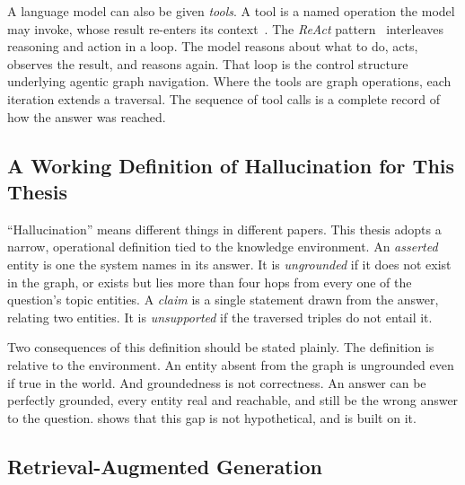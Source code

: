 A language model can also be given \emph{tools}. A tool is a named operation the
model may invoke, whose result re-enters its
context~\cite{schick2023toolformer}. The \emph{ReAct}
pattern~\cite{yao2023react} interleaves reasoning and action in a loop. The
model reasons about what to do, acts, observes the result, and reasons again.
That loop is the control structure underlying agentic graph navigation. Where
the tools are graph operations, each iteration extends a traversal. The sequence
of tool calls is a complete record of how the answer was reached.

\subsection{A Working Definition of Hallucination for This
Thesis}\label{sec:hallucination-def}

``Hallucination'' means different things in different papers. This thesis adopts
a narrow, operational definition tied to the knowledge
environment. An \emph{asserted} entity is one the system names in its answer. It
is \emph{ungrounded} if it does not exist in the graph, or exists but lies more
than four hops from every one of the question's topic entities. A \emph{claim}
is a single statement drawn from the answer, relating two entities. It is
\emph{unsupported} if the traversed triples do not entail it.

Two consequences of this definition should be stated plainly. The definition is
relative to the environment. An entity absent from the graph is ungrounded even
if true in the world. And groundedness is not correctness. An answer can be
perfectly grounded, every entity real and reachable, and still be the wrong
answer to the question.  shows that this gap is not
hypothetical, and  is built on it.

\subsection{Retrieval-Augmented Generation}\label{sec:rag}

